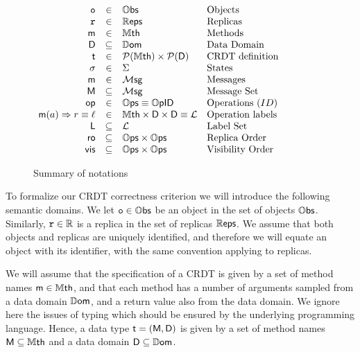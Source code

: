 \begin{figure}
  \centering

  \(
  \begin{array}[t]{rcll}
    \aobj & \in  & \objs & \text{Objects} \\
    \arep & \in & \reps & \text{Replicas} \\
    \amethod & \in & \methods & \text{Methods}\\
    \adomain & \subseteq & \datadomain & \text{Data Domain} \\
    \acrdttyp & \in & \powerset{\methods} \times \powerset{\adomain} & \text{CRDT definition} \\
    \astate & \in & \states & \text{States} \\
    \amesg & \in & \messages & \text{Messages} \\
    \amesgset & \subseteq & \messages & \text{Message Set} \\
    \aop & \in & \ops \equiv \opids & \text{Operations}\ (ID) \\
    \alabellong[\amethod]{\argv}{\retv} \equiv \alabel  & \in & \methods \times \adomain \times \adomain \equiv \labels & \text{Operation labels} \\
    \alabelset & \subseteq & \labels & \text{Label Set}\\
    \arepord & \subseteq & \ops \times \ops & \text{Replica Order} \\
    \avisord & \subseteq & \ops \times \ops & \text{Visibility Order}
  \end{array}
  \)
  \caption{Summary of notations}
  \label{fig:notations}
\end{figure}


To formalize our CRDT correctness criterion we will introduce the
following semantic domains.
%
We let $\mathtt{o} \in \mathbb{O}\mathsf{bs}$ be an object in the set of objects $\mathbb{O}\mathsf{bs}$. Similarly,
$\mathtt{r} \in \mathbb{R}$ is a replica in the set of replicas
$\mathbb{R}\mathsf{eps}$.
We assume that both objects and replicas are uniquely identified, and
therefore we will equate an object with its identifier, with the same
convention applying to replicas.

We will assume that the specification of a CRDT is given by a set of
method names $\mathsf{m} \in \mathbb{M}\mathsf{th}$, and that each method has a
number of arguments sampled from a data domain $\mathbb{D}\mathsf{om}$, and a
return value also from the data domain.
We ignore here the issues of typing which should be ensured by the
underlying programming language.
Hence, a data type $\mathsf{t} = (\mathsf{M}, \mathsf{D})$ is given by a
set of method names $\mathsf{M} \subseteq \mathbb{M}\mathsf{th}$ and a data domain
$\mathsf{D} \subseteq \mathbb{D}\mathsf{om}$.

